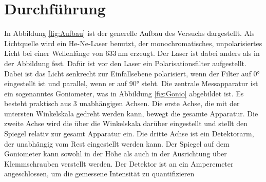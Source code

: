 \section{Durchführung}
\label{sec:Durchführung}
In Abbildung \ref{fig:Aufbau} ist der generelle Aufbau des Versuchs dargestellt.
Als Lichtquelle wird ein He-Ne-Laser benutzt, der monochromatisches, unpolarisiertes Licht bei einer Wellenlänge von $\qty{633}{\nano\meter}$ erzeugt.
Der Laser ist dabei anders als in der Abbildung fest. Dafür ist vor den Laser ein Polarisationsfilter
aufgestellt. Dabei ist das Licht senkrecht zur Einfallsebene polarisiert, wenn der Filter auf 0° eingestellt ist und parallel, wenn er 
auf 90° steht. Die zentrale Messapparatur ist ein sogenanntes Goniometer, was in Abbildung \ref{fig:Gonio} abgebildet ist.
Es besteht praktisch aus 3 unabhängigen Achsen. Die erste Achse, die mit der untersten Winkelskala gedreht werden kann, bewegt die gesamte Apparatur.
Die zweite Achse wird die über die Winkelskala darüber eingestellt und stellt den Spiegel relativ zur gesamt Apparatur ein.
Die dritte Achse ist ein Detektorarm, der unabhängig vom Rest eingestellt werden kann. Der Spiegel auf dem Goniometer kann sowohl in der Höhe als auch in 
der Ausrichtung über Klemmschrauben verstellt werden. Der Detektor ist an ein Amperemeter angeschlossen, um die gemessene Intensität zu quantifizieren 

